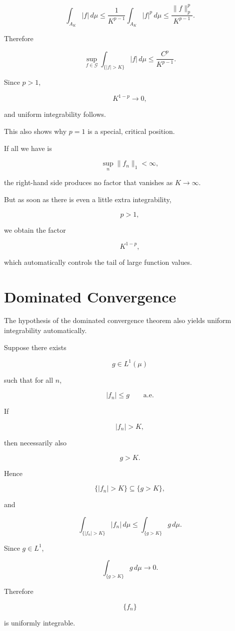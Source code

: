 \documentclass[11pt]{article}
\begin{document}
\[
\int_{A_K}|f|\,d\mu
\leq
\frac1{K^{p-1}}
\int_{A_K}|f|^p\,d\mu
\leq
\frac{\|f\|_p^p}{K^{p-1}}.
\]

Therefore

\[
\sup_{f\in\mathcal G}
\int_{\{|f|>K\}}|f|\,d\mu
\leq
\frac{C^p}{K^{p-1}}.
\]

Since $p>1$,

\[
K^{1-p}\to0,
\]

and uniform integrability follows.

This also shows why $p=1$ is a special, critical position.

If all we have is

\[
\sup_n\|f_n\|_1<\infty,
\]

the right-hand side produces no factor that vanishes as $K\to\infty$.

But as soon as there is even a little extra integrability,

\[
p>1,
\]

we obtain the factor

\[
K^{1-p},
\]

which automatically controls the tail of large function values.


\section{Dominated Convergence}


The hypothesis of the dominated convergence theorem also yields uniform integrability automatically.

Suppose there exists

\[
g\in L^1(\mu)
\]

such that for all $n$,

\[
|f_n|\leq g
\qquad\text{a.e.}
\]

If

\[
|f_n|>K,
\]

then necessarily also

\[
g>K.
\]

Hence

\[
\{|f_n|>K\}
\subseteq
\{g>K\},
\]

and

\[
\int_{\{|f_n|>K\}}|f_n|\,d\mu
\leq
\int_{\{g>K\}}g\,d\mu.
\]

Since $g\in L^1$,

\[
\int_{\{g>K\}}g\,d\mu\to0.
\]

Therefore

\[
\{f_n\}
\]

is uniformly integrable.
\end{document}

